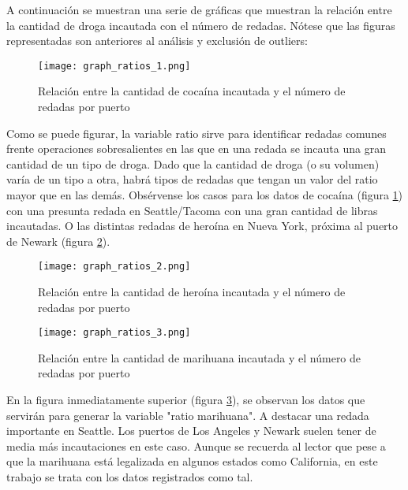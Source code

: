 \documentclass[12pt]{article}
\begin{document}
		A continuación se muestran una serie de gráficas que muestran la relación entre la cantidad de droga incautada con el número de redadas. Nótese que las figuras representadas son anteriores al análisis y exclusión de outliers:
		
		\begin{figure}[H]
			\caption{\label{graph_ratios_1} Relación entre la cantidad de cocaína incautada y el número de redadas por puerto}
			\centering
			\hspace*{1cm}
			\texttt{[image: graph\_ratios\_1.png]}
		\end{figure}
		
		Como se puede figurar, la variable ratio sirve para identificar redadas comunes frente operaciones sobresalientes en las que en una redada se incauta una gran cantidad de un tipo de droga. Dado que la cantidad de droga (o su volumen) varía de un tipo a otra, habrá tipos de redadas que tengan un valor del ratio mayor que en las demás. Obsérvense los casos para los datos de cocaína (figura \ref{graph_ratios_1}) con una presunta redada en Seattle/Tacoma con una gran cantidad de libras incautadas. O las distintas redadas de heroína en Nueva York, próxima al puerto de Newark (figura \ref{graph_ratios_2}).
		
		\begin{figure}[H]
			\caption{\label{graph_ratios_2} Relación entre la cantidad de heroína incautada y el número de redadas por puerto}
			\centering
			\hspace*{1cm}
			\texttt{[image: graph\_ratios\_2.png]}
		\end{figure}
		
		\begin{figure}[H]
			\caption{\label{graph_ratios_3} Relación entre la cantidad de marihuana incautada y el número de redadas por puerto}
			\centering
			\hspace*{1cm}
			\texttt{[image: graph\_ratios\_3.png]}
		\end{figure}
		
		En la figura inmediatamente superior (figura \ref{graph_ratios_3}), se observan los datos que servirán para generar la variable "ratio marihuana". A destacar una redada importante en Seattle. Los puertos de Los Angeles y Newark suelen tener de media más incautaciones en este caso. Aunque se recuerda al lector que pese a que la marihuana está legalizada en algunos estados como California, en este trabajo se trata con los datos registrados como tal.
		
\end{document}
